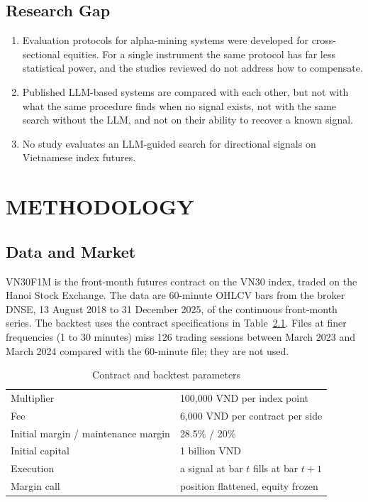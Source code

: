 \documentclass[12pt,a4paper,oneside]{book}
\theoremstyle{definition}
\begin{document}
\section{Research Gap}

\begin{enumerate}
  \item Evaluation protocols for alpha-mining systems were developed for cross-sectional equities. For a single instrument the same protocol has far less statistical power, and the studies reviewed do not address how to compensate.
  \item Published LLM-based systems are compared with each other, but not with what the same procedure finds when no signal exists, not with the same search without the LLM, and not on their ability to recover a known signal.
  \item No study evaluates an LLM-guided search for directional signals on Vietnamese index futures.
\end{enumerate}

\chapter{METHODOLOGY}
\label{ch3}

\section{Data and Market}
\label{sec:data}

VN30F1M is the front-month futures contract on the VN30 index, traded on the Hanoi Stock Exchange. The data are 60-minute OHLCV bars from the broker DNSE, 13 August 2018 to 31 December 2025, of the continuous front-month series. The backtest uses the contract specifications in Table~\ref{tab:contract}. Files at finer frequencies (1 to 30 minutes) miss 126 trading sessions between March 2023 and March 2024 compared with the 60-minute file; they are not used.

\begin{table}[H]
\centering
\caption{Contract and backtest parameters}
\label{tab:contract}
\begin{tabular}{ll}
\toprule
Multiplier & 100,000 VND per index point \\
Fee & 6,000 VND per contract per side \\
Initial margin / maintenance margin & 28.5\% / 20\% \\
Initial capital & 1 billion VND \\
Execution & a signal at bar $t$ fills at bar $t+1$ \\
Margin call & position flattened, equity frozen \\
\bottomrule
\end{tabular}
\end{table}
\end{document}
